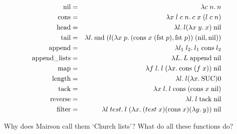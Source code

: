 \begin{enumerate}
\begin{eqnarray*}
\mbox{nil}   & = & \lambda c\; n.\: n                                                                                                         \\
\mbox{cons}  & = & \lambda x\; l\; c\; n.\: c\; x\; (l\; c\; n)                                                                               \\
\mbox{head}  & = & \lambda l.\: l (\lambda x\; y.\: x)\; \mbox{nil}                                                                               \\
\mbox{tail}  & = & \lambda l.\: \mbox{snd}\; (l (\lambda x\; p.\: (\mbox{cons}\; x\; (\mbox{fst}\; p),\mbox{fst}\; p))\; (\mbox{nil},\mbox{nil})) \\
\mbox{append}  & = & \lambda l_1\; l_2.\: l_1\; \mbox{cons}\; l_2                                                                             \\
\mbox{append\_lists}  & = & \lambda L.\: L\; \mbox{append}\; \mbox{nil}                                                                       \\
\mbox{map}     & = & \lambda f\; l.\: l\; (\lambda x.\: \mbox{cons}\; (f\; x))\; \mbox{nil}                                                       \\
\mbox{length}  & = & \lambda l.\: l (\lambda x.\: \mbox{SUC}) 0                                                                                   \\
\mbox{tack}  & = & \lambda x\; l.\: l\; \mbox{cons}\; (\mbox{cons}\; x\; \mbox{nil})                                                          \\
\mbox{reverse}  & = & \lambda l.\: l\; \mbox{tack}\; \mbox{nil}                                                                               \\
\mbox{filter}  & = & \lambda l\; test.\: l\; (\lambda x.\: (test\; x) (\mbox{cons}\; x) (\lambda y.\: y))\; \mbox{nil}
\end{eqnarray*}

Why does Mairson call them `Church lists'? What do all these functions do?

\end{enumerate}
